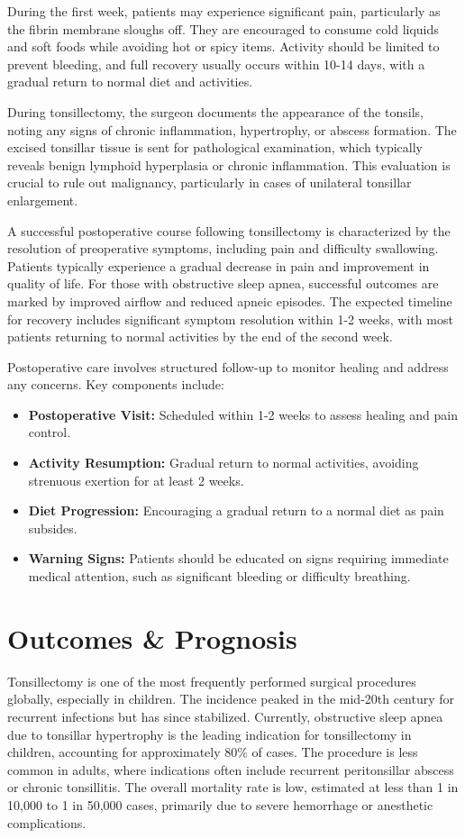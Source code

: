 During the first week, patients may experience significant pain, particularly as the fibrin membrane sloughs off. They are encouraged to consume cold liquids and soft foods while avoiding hot or spicy items. Activity should be limited to prevent bleeding, and full recovery usually occurs within 10-14 days, with a gradual return to normal diet and activities.

During tonsillectomy, the surgeon documents the appearance of the tonsils, noting any signs of chronic inflammation, hypertrophy, or abscess formation. The excised tonsillar tissue is sent for pathological examination, which typically reveals benign lymphoid hyperplasia or chronic inflammation. This evaluation is crucial to rule out malignancy, particularly in cases of unilateral tonsillar enlargement.

A successful postoperative course following tonsillectomy is characterized by the resolution of preoperative symptoms, including pain and difficulty swallowing. Patients typically experience a gradual decrease in pain and improvement in quality of life. For those with obstructive sleep apnea, successful outcomes are marked by improved airflow and reduced apneic episodes. The expected timeline for recovery includes significant symptom resolution within 1-2 weeks, with most patients returning to normal activities by the end of the second week.

Postoperative care involves structured follow-up to monitor healing and address any concerns. Key components include:

\begin{itemize}
  \item \textbf{Postoperative Visit:} Scheduled within 1-2 weeks to assess healing and pain control.
  \item \textbf{Activity Resumption:} Gradual return to normal activities, avoiding strenuous exertion for at least 2 weeks.
  \item \textbf{Diet Progression:} Encouraging a gradual return to a normal diet as pain subsides.
  \item \textbf{Warning Signs:} Patients should be educated on signs requiring immediate medical attention, such as significant bleeding or difficulty breathing.
\end{itemize}

\section*{Outcomes \& Prognosis}
Tonsillectomy is one of the most frequently performed surgical procedures globally, especially in children. The incidence peaked in the mid-20th century for recurrent infections but has since stabilized. Currently, obstructive sleep apnea due to tonsillar hypertrophy is the leading indication for tonsillectomy in children, accounting for approximately 80\% of cases. The procedure is less common in adults, where indications often include recurrent peritonsillar abscess or chronic tonsillitis. The overall mortality rate is low, estimated at less than 1 in 10,000 to 1 in 50,000 cases, primarily due to severe hemorrhage or anesthetic complications.

